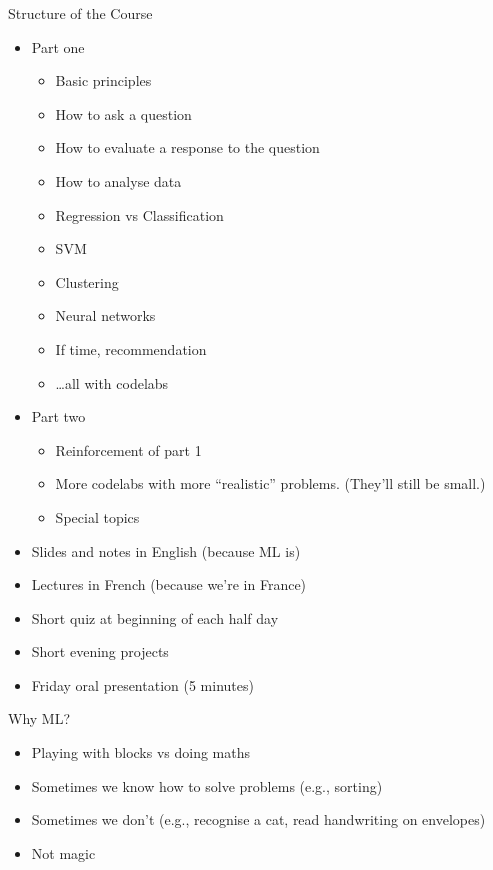 




Structure of the Course
\begin{itemize}
\item Part one
  \begin{itemize}
  \item Basic principles
  \item How to ask a question
  \item How to evaluate a response to the question
  \item How to analyse data
  \item Regression vs Classification
  \item SVM
  \item Clustering
  \item Neural networks
  \item If time, recommendation
  \item \dots all with codelabs
  \end{itemize}
\item Part two
  \begin{itemize}
  \item Reinforcement of part 1
  \item More codelabs with more ``realistic'' problems.  (They'll still be small.)
  \item Special topics
  \end{itemize}
\item Slides and notes in English (because ML is)
\item Lectures in French (because we're in France)
\item Short quiz at beginning of each half day
\item Short evening projects
\item Friday oral presentation (5 minutes)
\end{itemize}

Why ML?
\begin{itemize}
\item Playing with blocks vs doing maths
\item Sometimes we know how to solve problems (e.g., sorting)
\item Sometimes we don't (e.g., recognise a cat, read handwriting on envelopes)
\item Not magic
\end{itemize}

